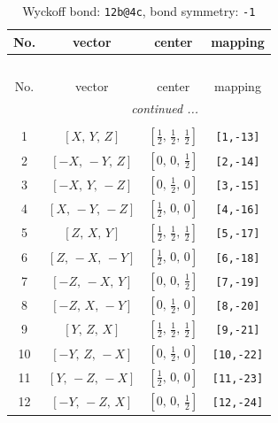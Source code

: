 \documentclass[fleqn,8pt]{jsarticle}
\begin{document}
\begin{longtable}{cccc}
\caption{Wyckoff bond: {\tt 12b@4c}, bond symmetry: {\tt -1}}
 \\
 \hline \hline
No. & vector & center & mapping \\ \hline \endfirsthead

\multicolumn{3}{l}{\tablename\ \thetable{}} \\
 \hline \hline
No. & vector & center & mapping \\ \hline \endhead

 \hline \hline
\multicolumn{3}{r}{\footnotesize\it continued ...} \\ \endfoot

 \hline \hline
\multicolumn{3}{r}{} \\ \endlastfoot

1 & $\left[ X,\, Y,\, Z \right]$ & $\left[ \frac{1}{2},\, \frac{1}{2},\, \frac{1}{2} \right]$ & {\tt [1,-13]} \\ \hline
2 & $\left[ - X,\, - Y,\, Z \right]$ & $\left[ 0,\, 0,\, \frac{1}{2} \right]$ & {\tt [2,-14]} \\ \hline
3 & $\left[ - X,\, Y,\, - Z \right]$ & $\left[ 0,\, \frac{1}{2},\, 0 \right]$ & {\tt [3,-15]} \\ \hline
4 & $\left[ X,\, - Y,\, - Z \right]$ & $\left[ \frac{1}{2},\, 0,\, 0 \right]$ & {\tt [4,-16]} \\ \hline
5 & $\left[ Z,\, X,\, Y \right]$ & $\left[ \frac{1}{2},\, \frac{1}{2},\, \frac{1}{2} \right]$ & {\tt [5,-17]} \\ \hline
6 & $\left[ Z,\, - X,\, - Y \right]$ & $\left[ \frac{1}{2},\, 0,\, 0 \right]$ & {\tt [6,-18]} \\ \hline
7 & $\left[ - Z,\, - X,\, Y \right]$ & $\left[ 0,\, 0,\, \frac{1}{2} \right]$ & {\tt [7,-19]} \\ \hline
8 & $\left[ - Z,\, X,\, - Y \right]$ & $\left[ 0,\, \frac{1}{2},\, 0 \right]$ & {\tt [8,-20]} \\ \hline
9 & $\left[ Y,\, Z,\, X \right]$ & $\left[ \frac{1}{2},\, \frac{1}{2},\, \frac{1}{2} \right]$ & {\tt [9,-21]} \\ \hline
10 & $\left[ - Y,\, Z,\, - X \right]$ & $\left[ 0,\, \frac{1}{2},\, 0 \right]$ & {\tt [10,-22]} \\ \hline
11 & $\left[ Y,\, - Z,\, - X \right]$ & $\left[ \frac{1}{2},\, 0,\, 0 \right]$ & {\tt [11,-23]} \\ \hline
12 & $\left[ - Y,\, - Z,\, X \right]$ & $\left[ 0,\, 0,\, \frac{1}{2} \right]$ & {\tt [12,-24]} \\
\end{longtable}
\end{document}
